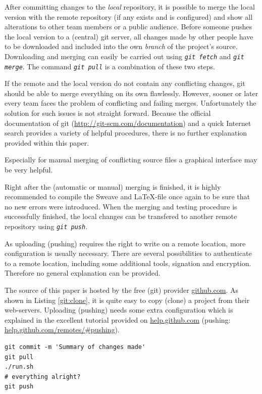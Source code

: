 \documentclass{ifacconf}
\begin{document}
After committing changes to the \textit{local} repository, it is possible to merge the local version 
with the remote repository (if any exists and is configured) and show all alterations to other team members or a
public audience. Before someone pushes the local version to a (central) git server, all changes made
by other people have to be downloaded and included into the own \textit{branch} of the project's source.
Downloading and merging can easily be carried out using \textit{\lstinline!git fetch!} and 
\textit{\lstinline!git merge!}. The command \textit{\lstinline!git pull!} is a combination of
these two steps.

If the remote and the local version do not contain any conflicting changes, 
git should be able to merge everything on its own flawlessly. However, sooner or later every team
faces the problem of conflicting and failing merges. Unfortunately the solution for such issues is not straight forward.
Because the official documentation of git (\url{http://git-scm.com/documentation}) and a quick 
Internet search provides a variety of helpful procedures, 
there is no further explanation provided within this paper.

Especially for manual merging of conflicting source files a graphical interface may be very helpful.

Right after the (automatic or manual) merging is finished, it is highly recommended to compile 
the Sweave and \LaTeX-file once again to be sure that no new errors were introduced. When the merging and
testing procedure is successfully finished, the local changes can be transfered to another remote repository
using \textit{\lstinline!git push!}.

As uploading (pushing) requires the right to write on a remote location, more configuration is usually 
necessary. There are several possibilities to authenticate to a remote location, 
including some additional tools, signation and encryption. Therefore no general explanation can be provided.

The source of this paper is hosted by the free (git) provider \url{github.com}. As shown in 
Listing \ref{git:clone}, it is quite easy to copy (clone) a project from their web-servers. 
Uploading (pushing) needs some extra configuration which is explained in the excellent tutorial
provided on \url{help.github.com} (pushing: \url{help.github.com/remotes/#pushing}).

\begin{lstlisting}
git commit -m 'Summary of changes made'
git pull
./run.sh
# everything alright?
git push
\end{lstlisting}
\end{document}
